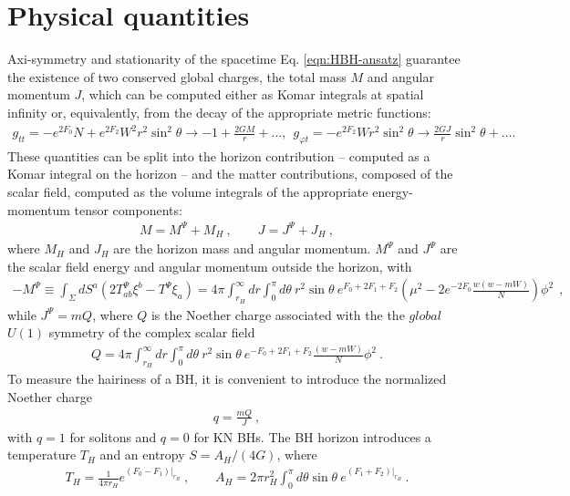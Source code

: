 \section{Physical quantities}
\label{sec_pq}
Axi-symmetry and stationarity of the spacetime Eq. \eqref{eqn:HBH-ansatz}
 guarantee the existence of two conserved global charges, the total mass $M$ and angular momentum $J$, 
which can be computed either as Komar integrals at spatial infinity or, equivalently, 
from the decay of the appropriate metric functions:
%
\begin{eqnarray}
\label{KNasym}
g_{tt} =-e^{2F_0}N+e^{2F_2}W^2r^2 \sin^2 \theta 
\to
 -1+\frac{2GM}{r}+\dots, ~~
g_{\varphi t}=-e^{2F_2}W r^2 \sin^2 \theta
\to 
\frac{2GJ}{r}\sin^2\theta+\nonumber \dots.  
\end{eqnarray}
%
These quantities can be split into the horizon contribution -- computed as a Komar integral on the horizon -- and the matter contributions, composed of the scalar field, computed as the volume integrals of the appropriate energy-momentum tensor components: 
%
\begin{eqnarray}
\label{MH-hor}
M=M^\Psi+M_H\ , \qquad J=J^\Psi+J_H\ ,
\end{eqnarray}
where $M_H$ and $J_H$  are the horizon mass and angular momentum.
$M^\Psi$ and $J^\Psi$ are the scalar field energy and angular momentum outside the horizon,
with  
\begin{align}
\label{Mpsi}
-M^\Psi\equiv  \int_{\Sigma} dS^a (2T_{ab}^\Psi \xi^b-T^\Psi\xi_a)
 = 4\pi \int_{r_H}^\infty dr \int_0^\pi d\theta~r^2\sin \theta ~e^{F_0+2F_1+F_2}
 \left(
 \mu^2-2 e^{-2F_0}\frac{w(w-mW)}{N}
 \right)\phi^2 ~~,
\end{align}
while $J^\Psi=mQ$,
where $Q$ is the Noether charge 
associated with the the $global$ $U(1)$ symmetry of the complex scalar field 
\begin{eqnarray}
\label{Q-int}
Q=4\pi \int_{r_H}^\infty dr \int_0^\pi d\theta 
~r^2\sin \theta ~e^{-F_0+2F_1+F_2}  \frac{(w-mW)}{N}\phi^2 ~.
\end{eqnarray}
To measure the hairiness of a BH, it is convenient 
to introduce the normalized Noether charge
\begin{eqnarray}
\label{KNq}
q=\frac{mQ}{J}~,
\end{eqnarray}
with $q=1$ for solitons and $q=0$ for KN BHs.
The BH horizon introduces a temperature $T_H$ and an entropy $S={A_H}/({4G})$,
where 
%
\begin{eqnarray}
\label{KNTHAH}
T_H=\frac{1}{4\pi r_H}e^{(F_0-F_1)|_{r_H}}\ ,
\qquad
A_H=2\pi r_H^2 \int_0^\pi d\theta \sin \theta~e^{(F_1+F_2)|_{r_H}} \ .
\end{eqnarray}
